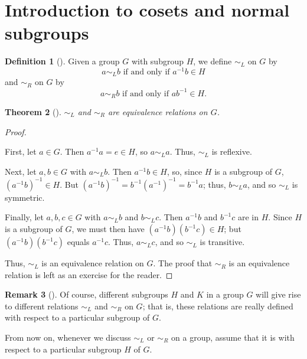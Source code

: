 \documentclass[10pt,]{book}
\theoremstyle{plain}
\newtheorem{theorem}{Theorem}[section]
\theoremstyle{definition}
\newtheorem{definition}[theorem]{Definition}
\theoremstyle{definition}
\newtheorem{remark}[theorem]{Remark}
\theoremstyle{definition}
\theoremstyle{definition}
\numberwithin{equation}{section}
\def\siml{\sim_L}
\def\simr{\sim_R}
\begin{document}
\section[{Introduction to cosets and normal subgroups}]{Introduction to cosets and normal subgroups}\label{section-23}
\begin{definition}[{}]\label{definition-61}
\label{notation-66}
\label{notation-67}
Given a group \(G\) with subgroup \(H\), we define \(\siml\) on \(G\) by%
\begin{equation*}
a\siml b \text{ if and only if }
a^{-1}b\in H
\end{equation*}
and \(\simr\) on \(G\) by%
\begin{equation*}
a\simr b \text{ if and only if }
ab^{-1}\in H.
\end{equation*}
%
\end{definition}
\begin{theorem}[{}]\label{simlreq}
\(\siml\) and \(\simr\) are equivalence relations on \(G\).%
\end{theorem}
\begin{proof}\hypertarget{proof-41}{}
First, let \(a\in G\). Then \(a^{-1}a=e\in H\), so \(a\siml a\). Thus, \(\siml\) is reflexive.%
\par
Next, let \(a,b\in G\) with \(a\siml b\). Then \(a^{-1}b\in H\), so, since \(H\) is a subgroup of \(G\), \((a^{-1}b)^{-1}\in H\). But \((a^{-1}b)^{-1}=b^{-1}(a^{-1})^{-1}=b^{-1}a\); thus, \(b\siml a\), and so \(\siml\) is symmetric.%
\par
Finally, let \(a,b,c\in G\) with \(a\siml b\) and \(b\siml c\). Then \(a^{-1}b\) and \(b^{-1}c\) are in \(H\). Since \(H\) is a subgroup of \(G\), we must then have \((a^{-1}b)(b^{-1}c)\in H\); but \((a^{-1}b)(b^{-1}c)\) equals \(a^{-1}c\). Thus, \(a\siml c\), and so \(\siml\) is transitive.%
\par
Thus, \(\siml\) is an equivalence relation on \(G\). The proof that \(\simr\) is an equivalence relation is left as an exercise for the reader.%
\end{proof}
\begin{remark}[]\label{remark-38}
Of course, different subgroups \(H\) and \(K\) in a group \(G\) will give rise to different relations \(\siml\) and \(\simr\) on \(G\); that is, these relations are really defined  with respect to a particular subgroup of \(G\).%
\end{remark}
From now on, whenever we discuss \(\siml\) or \(\simr\) on a group, assume that it is with respect to a particular subgroup \(H\) of \(G\).%
\end{document}
